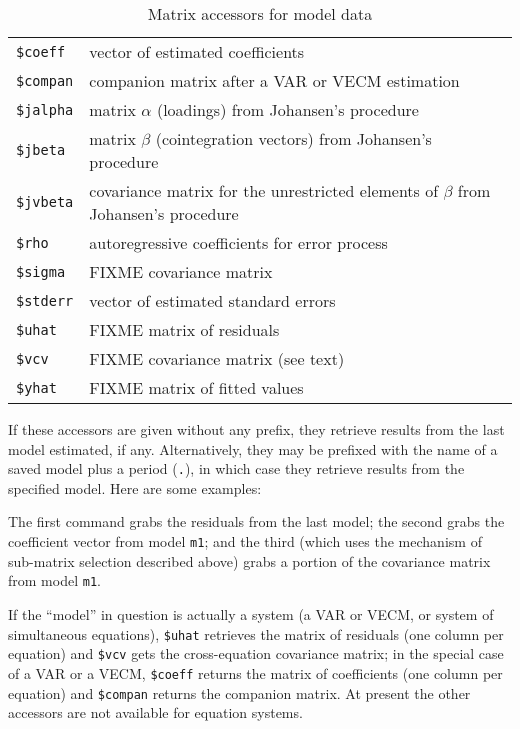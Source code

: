 \begin{table}[htbp]
\centering
\begin{tabular}{ll}
\texttt{\$coeff}  & vector of estimated coefficients \\
\texttt{\$compan} & companion matrix after a VAR or VECM estimation \\
\texttt{\$jalpha} & matrix $\alpha$ (loadings) from Johansen's procedure \\
\texttt{\$jbeta}  & matrix $\beta$ (cointegration vectors) from
Johansen's procedure \\
\texttt{\$jvbeta} & covariance matrix for the unrestricted elements of
$\beta$ from Johansen's procedure \\
\texttt{\$rho}    & autoregressive coefficients for error process \\
\texttt{\$sigma}  & FIXME covariance matrix \\
\texttt{\$stderr} & vector of estimated standard errors \\
\texttt{\$uhat}   & FIXME matrix of residuals \\
\texttt{\$vcv}    & FIXME covariance matrix (see text) \\
\texttt{\$yhat}   & FIXME matrix of fitted values 
\end{tabular}
\caption{Matrix accessors for model data}
\label{tab:matrix-accessors}
\end{table}

If these accessors are given without any prefix, they retrieve results
from the last model estimated, if any.  Alternatively, they may be
prefixed with the name of a saved model plus a period (\texttt{.}), in
which case they retrieve results from the specified model.  Here are
some examples:
%
The first command grabs the residuals from the last model; the second
grabs the coefficient vector from model \texttt{m1}; and the third
(which uses the mechanism of sub-matrix selection described above)
grabs a portion of the covariance matrix from model \texttt{m1}.

If the ``model'' in question is actually a system (a VAR or VECM, or
system of simultaneous equations), \verb|$uhat| retrieves the matrix
of residuals (one column per equation) and \verb|$vcv| gets the
cross-equation covariance matrix; in the special case of a VAR or a
VECM, \verb|$coeff| returns the matrix of coefficients (one column per
equation) and \verb|$compan| returns the companion matrix.  At present
the other accessors are not available for equation systems.


